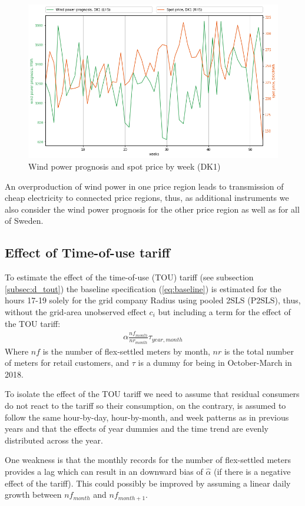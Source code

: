 \vspace{-1em}
\begin{figure}[H]
  \centering
  \caption{Wind power prognosis and spot price by week (DK1)}
  \label{fig:wp_price_dk1_week}
    \includegraphics[width=1 \textwidth]{03_figures/wp_DK1_weeks}
\end{figure}
\noindent
An overproduction of wind power in one price region leads to transmission of cheap electricity to connected price regions, thus, as additional instruments we also consider the wind power prognosis for the other price region as well as for all of Sweden.

\subsection{Effect of Time-of-use tariff}
\label{subsec:e_tout}
To estimate the effect of the time-of-use (TOU) tariff (see subsection \ref{subsec:d_tout}) the baseline specification (\ref{eq:baseline}) is estimated for the hours 17-19 solely for the grid company Radius using pooled 2SLS (P2SLS), thus, without the grid-area unobserved effect $c_i$ but including a term for the effect of the TOU tariff:
\begin{align}
  \alpha\frac{nf_{month}}{nr_{month}}\tau_{year,month}
  \label{eq:tout}
\end{align}
Where $nf$ is the number of flex-settled meters by month, $nr$ is the total number of meters for retail customers, and $\tau$ is a dummy for being in October-March in 2018.
\bigskip\par
To isolate the effect of the TOU tariff we need to assume that residual consumers do not react to the tariff so their consumption, on the contrary, is assumed to follow the same hour-by-day, hour-by-month, and week patterns as in previous years and that the effects of year dummies and the time trend are evenly distributed across the year.
\par
One weakness is that the monthly records for the number of flex-settled meters provides a lag which can result in an downward bias of $\widehat{\alpha}$ (if there is a negative effect of the tariff). This could possibly be improved by assuming a linear daily growth between $nf_{month}$ and $nf_{month+1}$.


